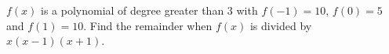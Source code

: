 $f(x)$ is a polynomial of degree greater than $3$ with $f(-1)=10$, $f(0)=5$ and $f(1)=10$. Find the remainder when $f(x)$ is divided by $x(x-1)(x+1)$.
